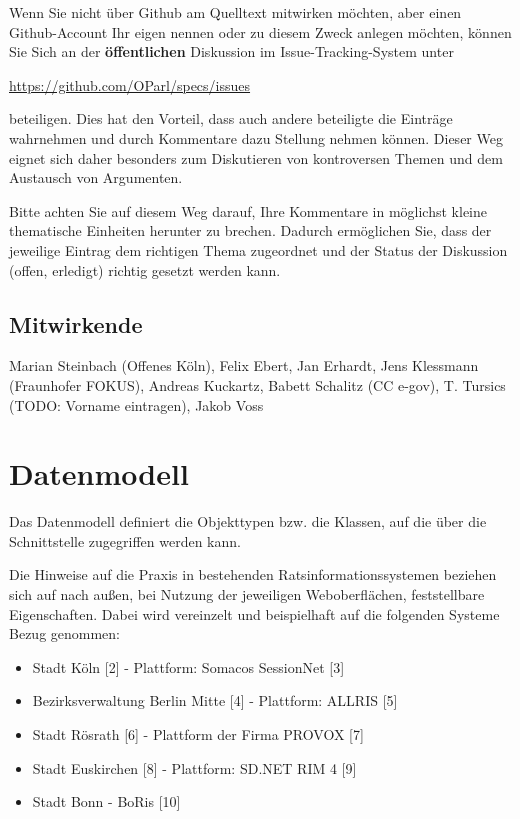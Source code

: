 \documentclass[,a4paper]{article}
\begin{document}
Wenn Sie nicht über Github am Quelltext mitwirken möchten, aber einen
Github-Account Ihr eigen nennen oder zu diesem Zweck anlegen möchten,
können Sie Sich an der \textbf{öffentlichen} Diskussion im
Issue-Tracking-System unter

\href{https://github.com/OParl/specs/issues}{https://github.com/OParl/specs/issues}

beteiligen. Dies hat den Vorteil, dass auch andere beteiligte die
Einträge wahrnehmen und durch Kommentare dazu Stellung nehmen können.
Dieser Weg eignet sich daher besonders zum Diskutieren von kontroversen
Themen und dem Austausch von Argumenten.

Bitte achten Sie auf diesem Weg darauf, Ihre Kommentare in möglichst
kleine thematische Einheiten herunter zu brechen. Dadurch ermöglichen
Sie, dass der jeweilige Eintrag dem richtigen Thema zugeordnet und der
Status der Diskussion (offen, erledigt) richtig gesetzt werden kann.

\subsection{Mitwirkende}

Marian Steinbach (Offenes Köln), Felix Ebert, Jan Erhardt, Jens
Klessmann (Fraunhofer FOKUS), Andreas Kuckartz, Babett Schalitz (CC
e-gov), T. Tursics (TODO: Vorname eintragen), Jakob Voss

\section{Datenmodell}

Das Datenmodell definiert die Objekttypen bzw. die Klassen, auf die über
die Schnittstelle zugegriffen werden kann.

Die Hinweise auf die Praxis in bestehenden Ratsinformationssystemen
beziehen sich auf nach außen, bei Nutzung der jeweiligen Weboberflächen,
feststellbare Eigenschaften. Dabei wird vereinzelt und beispielhaft auf
die folgenden Systeme Bezug genommen:

\begin{itemize}
\item
  Stadt Köln {[}2{]} - Plattform: Somacos SessionNet {[}3{]}
\item
  Bezirksverwaltung Berlin Mitte {[}4{]} - Plattform: ALLRIS {[}5{]}
\item
  Stadt Rösrath {[}6{]} - Plattform der Firma PROVOX {[}7{]}
\item
  Stadt Euskirchen {[}8{]} - Plattform: SD.NET RIM 4 {[}9{]}
\item
  Stadt Bonn - BoRis {[}10{]}
\end{itemize}
\end{document}
